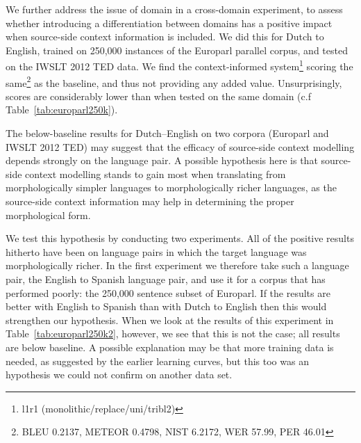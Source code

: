 \documentclass[smallextended]{svjour3}       %
\theoremstyle{break}
\begin{document}
We further address the issue of domain in a cross-domain experiment, to assess
whether introducing a differentiation between domains has a positive impact
when source-side context information is included. We did this for Dutch to
English, trained on 250,000 instances of the Europarl parallel corpus, and
tested on the IWSLT 2012 TED data. We find the context-informed
system\footnote{l1r1 (monolithic/replace/uni/tribl2)} scoring the
same\footnote{BLEU 0.2137, METEOR 0.4798, NIST 6.2172, WER 57.99, PER 46.01} as
the baseline, and thus not providing any added value. Unsurprisingly, scores
are considerably lower than when tested on the same domain (c.f
Table~\ref{tab:europarl250k}).

The below-baseline results for Dutch--English on two corpora (Europarl and IWSLT
2012 TED) may suggest that the efficacy of source-side context modelling
depends strongly on the language pair. A possible hypothesis here is that
source-side context modelling stands to gain most when translating from
morphologically simpler languages to morphologically richer languages, as the
source-side context information may help in determining the proper
morphological form. 

We test this hypothesis by conducting two experiments. All of the positive
results hitherto have been on language pairs in which the target language was
morphologically richer.  In the first experiment we therefore take such a
language pair, the English to Spanish language pair, and use it for a corpus
that has performed poorly: the 250,000 sentence subset of Europarl.  If the
results are better with English to Spanish than with Dutch to English
then this would strengthen our hypothesis. When we look at the results of
this experiment in Table~\ref{tab:europarl250k2}, however, we see
that this is not the case; all results are below baseline. A possible
explanation may be that more training data is needed, as suggested by the
earlier learning curves, but this too was an hypothesis we could not confirm on
another data set.
\end{document}
